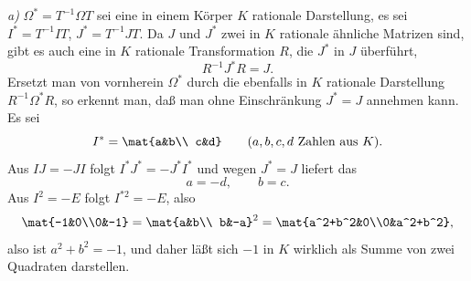 \emph{a)} $\Omega^*=T^{-1}\Omega T$ sei eine in einem Körper $K$ rationale Darstellung, es sei $I^*=T^{-1}IT$, $J^*=T^{-1}JT$. Da $J$ und $J^*$ zwei in $K$ rationale ähnliche Matrizen sind, gibt es auch eine in $K$ rationale Transformation $R$, die $J^*$ in $J$ überführt,
\[
        R^{-1}J^*R=J.
\]
Ersetzt man von vornherein $\Omega^*$ durch die ebenfalls in $K$ rationale Darstellung $R^{-1}\Omega^*R$, so erkennt man, daß man ohne Einschränkung $J^*=J$ annehmen kann. Es sei
\[
        I^*=\mat{a&b\\ c&d}\qquad (a,b,c,d\text{ Zahlen aus }K).
\]
Aus $IJ=-JI$ folgt $I^*J^*=-J^*I^*$ und wegen $J^*=J$ liefert das
\[
        a=-d,
        \qquad b=c.
\]
Aus $I^2=-E$ folgt $I^{*2}=-E$, also
\[
        \mat{-1&0\\0&-1}=\mat{a&b\\ b&-a}^2
        =\mat{a^2+b^2&0\\0&a^2+b^2},
\]
also ist $a^2+b^2=-1$, und daher läßt sich $-1$ in $K$ wirklich als Summe von zwei Quadraten darstellen.
